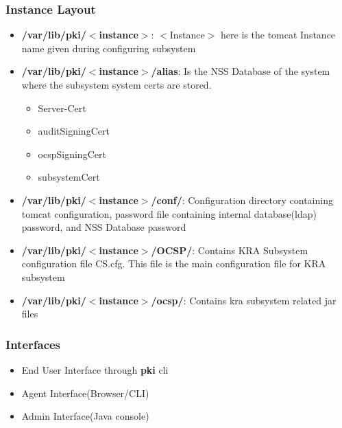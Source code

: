 \documentclass[a4paper]{article}
\begin{document}
\subsubsection{Instance Layout}
    \begin{itemize}
        \item \textbf{/var/lib/pki/$<$instance$>$}: $<$Instance$>$ here is the tomcat Instance name 
            given during configuring subsystem
        \item \textbf{/var/lib/pki/$<$instance$>$/alias}: Is the NSS Database of the system where the subsystem system 
            certs are stored. 
        \begin{itemize}
            \item Server-Cert
            \item auditSigningCert
            \item ocspSigningCert
            \item subsystemCert
        \end{itemize}
        \item \textbf{/var/lib/pki/$<$instance$>$/conf/}: Configuration directory containing tomcat configuration,
            password file containing internal database(ldap) password, and NSS Database password
        \item \textbf{/var/lib/pki/$<$instance$>$/OCSP/}: Contains KRA Subsystem configuration file CS.cfg. This file is
            the main configuration file for KRA subsystem
        \item \textbf{/var/lib/pki/$<$instance$>$/ocsp/}: Contains kra subsystem related jar files 
    \end{itemize}
\subsubsection{Interfaces}
\begin{itemize}
    \item End User Interface through \textbf{pki} cli
    \item Agent Interface(Browser/CLI)
    \item Admin Interface(Java console)
\end{itemize}
\end{document}
